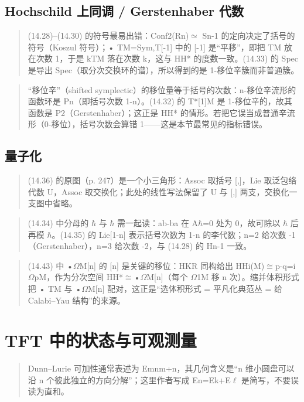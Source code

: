 \subsection*{Hochschild 上同调 / Gerstenhaber 代数}
\begin{quote}\small
(14.28)--(14.30) 的符号最易出错：Conf2(Rn)$\simeq$ Sn-1 的定向决定了括号的符号（Koszul 符号）；• TM=Sym,T[-1] 中的 [-1] 是“平移”，即把 TM 放在次数 1，于是 kTM 落在次数 k，这与 HH* 的度数一致。(14.33) 的 Spec 是导出 Spec（取分次交换环的谱），所以得到的是 1-移位辛簇而非普通簇。
\end{quote}

\begin{quote}\small
“移位辛”（shifted symplectic）的移位量等于括号的次数：n-移位辛流形的函数环是 Pn（即括号次数 1-n）。(14.32) 的 T*[1]M 是 1-移位辛的，故其函数是 P2（Gerstenhaber）；这正是 HH* 的情形。若把它误当成普通辛流形（0-移位），括号次数会算错 1——这是本节最常见的指标错误。
\end{quote}

\subsection*{量子化}
\begin{quote}\small
(14.36) 的原图（p. 247）是一个小三角形：Assoc 取括号 [,]，Lie 取泛包络代数 U，Assoc 取交换化；此处的线性写法保留了 U 与 [,] 两支，交换化一支图中省略。
\end{quote}

\begin{quote}\small
(14.34) 中分母的 $\hbar$ 与 $\hbar$ 需一起读：ab-ba 在 A$\hbar$=0 处为 0，故可除以 $\hbar$ 后再模 $\hbar$。(14.35) 的 Lie[1-n] 表示括号次数为 1-n 的李代数；n=2 给次数 -1（Gerstenhaber），n=3 给次数 -2，与 (14.28) 的 Hn-1 一致。
\end{quote}

\begin{quote}\small
(14.43) 中 •$\Omega$M[n] 的 [n] 是关键的移位：HKR 同构给出 HHi(M)$\cong$p-q=i$\Omega$pM，作为分次空间 HH*$\cong$•$\Omega$M[n]（每个 $\Omega$1M 移 n 次）。缩并体积形式把 • TM 与 •$\Omega$M[n] 配对，这正是“选体积形式 = 平凡化典范丛 = 给 Calabi–Yau 结构”的来源。
\end{quote}

\section{TFT 中的状态与可观测量}
\begin{quote}\small
Dunn--Lurie 可加性通常表述为 Emnm+n，其几何含义是“n 维小圆盘可以沿 n 个彼此独立的方向分解”；这里作者写成 En=Ek+E$\ell$ 是简写，不要误读为直和。
\end{quote}

